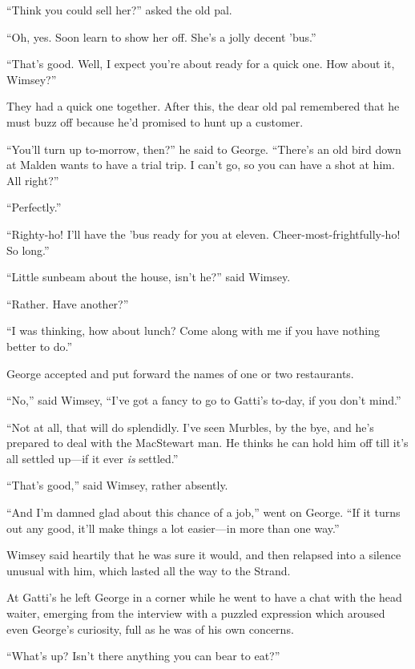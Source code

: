 \enquote{Think you could sell her?} asked the old pal.

\enquote{Oh, yes. Soon learn to show her off. She's a jolly decent 'bus.}

\enquote{That's good. Well, I expect you're about ready for a quick one. How about it, Wimsey?}

They had a quick one together. After this, the dear old pal remembered that he must buzz off because he'd promised to hunt up a customer.

\enquote{You'll turn up to-morrow, then?} he said to George. \enquote{There's an old bird down at Malden wants to have a trial trip. I can't go, so you can have a shot at him. All right?}

\enquote{Perfectly.}

\enquote{Righty-ho! I'll have the 'bus ready for you at eleven. Cheer-most-frightfully-ho! So long.}

\enquote{Little sunbeam about the house, isn't he?} said Wimsey.

\enquote{Rather. Have another?}

\enquote{I was thinking, how about lunch? Come along with me if you have nothing better to do.}

George accepted and put forward the names of one or two restaurants.

\enquote{No,} said Wimsey, \enquote{I've got a fancy to go to Gatti's to-day, if you don't mind.}

\enquote{Not at all, that will do splendidly. I've seen Murbles, by the bye, and he's prepared to deal with the MacStewart man. He thinks he can hold him off till it's all settled up\allowbreak---\allowbreak if it ever \textit{is} settled.}

\enquote{That's good,} said Wimsey, rather absently.

\enquote{And I'm damned glad about this chance of a job,} went on George. \enquote{If it turns out any good, it'll make things a lot easier\allowbreak---\allowbreak in more than one way.}

Wimsey said heartily that he was sure it would, and then relapsed into a silence unusual with him, which lasted all the way to the Strand.

At Gatti's he left George in a corner while he went to have a chat with the head waiter, emerging from the interview with a puzzled expression which aroused even George's curiosity, full as he was of his own concerns.

\enquote{What's up? Isn't there anything you can bear to eat?}

